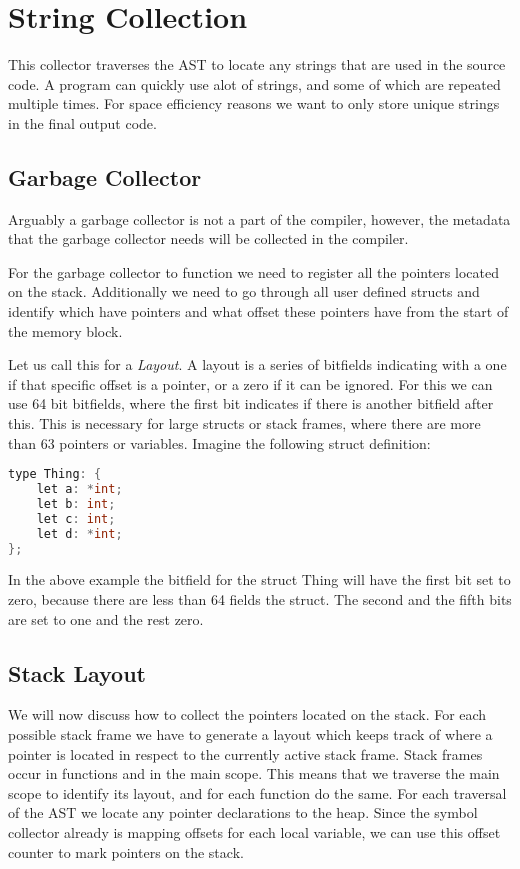 \section{String Collection}

This collector traverses the AST to locate any strings that are used in the source code. A program can quickly use alot of strings, and some of which are repeated multiple times. For space efficiency reasons we want to only store unique strings in the final output code.

\subsection{Garbage Collector}
Arguably a garbage collector is not a part of the compiler, however, the metadata that the garbage collector needs will be collected in the compiler.


For the garbage collector to function we need to register all the pointers located on the stack. Additionally we need to go through all user defined structs and identify which have pointers and what offset these pointers have from the start of the memory block. 

Let us call this for a \textit{Layout}. A layout is a series of bitfields indicating with a one if that specific offset is a pointer, or a zero if it can be ignored. For this we can use 64 bit bitfields, where the first bit indicates if there is another bitfield after this. This is necessary for large structs or stack frames, where there are more than 63 pointers or variables. Imagine the following struct definition:

\begin{lstlisting}[language=C,keywords={Thing, int},title=Type Definition]
type Thing: {
    let a: *int;
    let b: int;
    let c: int;
    let d: *int;
};
\end{lstlisting}

In the above example the bitfield for the struct Thing will have the first bit set to zero, because there are less than 64 fields the struct. The second and the fifth bits are set to one and the rest zero. 

\subsection{Stack Layout}
We will now discuss how to collect the pointers located on the stack. For each possible stack frame we have to generate a layout which keeps track of where a pointer is located in respect to the currently active stack frame. Stack frames occur in functions and in the main scope. This means that we traverse the main scope to identify its layout, and for each function do the same. For each traversal of the AST we locate any pointer declarations to the heap. Since the symbol collector already is mapping offsets for each local variable, we can use this offset counter to mark pointers on the stack. 

